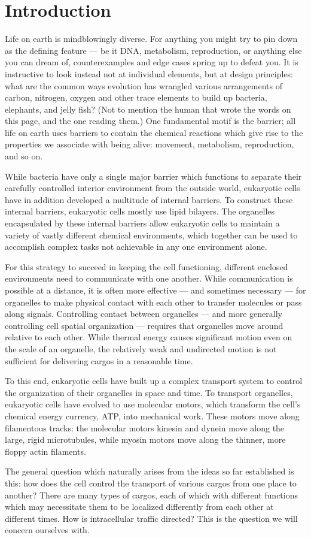 \chapter{Introduction}

Life on earth is mindblowingly diverse. For anything you might try to pin down as the defining feature --- be it DNA, metabolism, reproduction, or anything else you can dream of, counterexamples and edge cases spring up to defeat you. It is instructive to look instead not at individual elements, but at design principles: what are the common ways evolution has wrangled various arrangements of carbon, nitrogen, oxygen and other trace elements to build up bacteria, elephants, and jelly fish? (Not to mention the human that wrote the words on this page, and the one reading them.) One fundamental motif is the barrier; all life on earth uses barriers to contain the chemical reactions which give rise to the properties we associate with being alive: movement, metabolism, reproduction, and so on.

While bacteria have only a single major barrier which functions to separate their carefully controlled interior environment from the outside world, eukaryotic cells have in addition developed a multitude of internal barriers. To construct these internal barriers, eukaryotic cells mostly use lipid bilayers. The organelles encapsulated by these internal barriers allow eukaryotic cells to maintain a variety of vastly different chemical environments, which together can be used to accomplish complex tasks not achievable in any one environment alone. 

For this strategy to succeed in keeping the cell functioning, different enclosed environments need to communicate with one another. While communication is possible at a distance, it is often more effective --- and sometimes necessary --- for organelles to make physical contact with each other to transfer molecules or pass along signals. Controlling contact between organelles --- and more generally controlling cell spatial organization --- requires that organelles move around relative to each other. While thermal energy causes significant motion even on the scale of an organelle, the relatively weak and undirected motion is not sufficient for delivering cargos in a reasonable time. 

To this end, eukaryotic cells have built up a complex transport system to control the organization of their organelles in space and time. To transport organelles, eukaryotic cells have evolved to use molecular motors, which transform the cell's chemical energy currency, ATP, into mechanical work. These motors move along filamentous tracks: the molecular motors kinesin and dynein move along the large, rigid microtubules, while myosin motors move along the thinner, more floppy actin filaments.

The general question which naturally arises from the ideas so far established is this: how does the cell control the transport of various cargos from one place to another? There are many types of cargos, each of which with different functions which may necessitate them to be localized differently from each other at different times. How is intracellular traffic directed? This is the question we will concern ourselves with.
